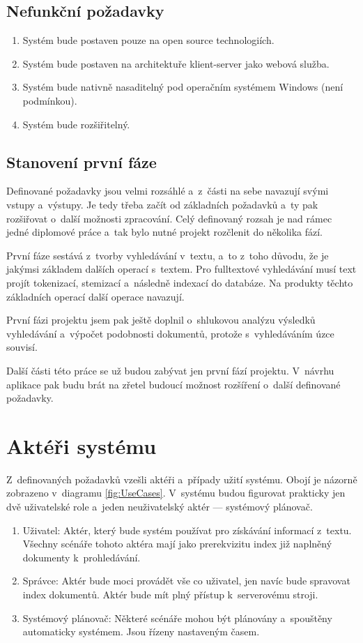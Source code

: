\subsection{Nefunkční požadavky}
\label{req_1}
\begin{enumerate}
	\item \label{req_10} Systém bude postaven pouze na open source technologiích.
	\item \label{req_11} Systém bude postaven na architektuře klient-server jako webová služba.
	\item \label{req_12} Systém bude nativně nasaditelný pod operačním systémem Windows (není podmínkou).
	\item \label{req_13} Systém bude rozšiřitelný.
\end{enumerate}

\subsection{Stanovení první fáze}
Definované požadavky jsou velmi rozsáhlé a~z~části na sebe navazují svými vstupy a~výstupy. Je tedy třeba začít od základních požadavků a~ty pak rozšiřovat o~další možnosti zpracování. Celý definovaný rozsah je nad rámec jedné diplomové práce a~tak bylo nutné projekt rozčlenit do několika fází.

První fáze sestává z~tvorby vyhledávání v~textu, a~to z~toho důvodu, že je jakýmsi základem dalších operací s~textem. Pro fulltextové vyhledávání musí text projít tokenizací, stemizací a~následně indexací do databáze. Na produkty těchto základních operací další operace navazují.

První fázi projektu jsem pak ještě doplnil o~shlukovou analýzu výsledků vyhledávání a~výpočet podobnosti dokumentů, protože s~vyhledáváním úzce souvisí.

Další části této práce se už budou zabývat jen první fází projektu. V~návrhu aplikace pak budu brát na zřetel budoucí možnost rozšíření o~další definované požadavky.

\section{Aktéři systému}
Z~definovaných požadavků vzešli aktéři a~případy užití systému. Obojí je názorně zobrazeno v~diagramu \ref{fig:UseCases}. V~systému budou figurovat prakticky jen dvě uživatelské role a~jeden neuživatelský aktér --- systémový plánovač.

\begin{enumerate}
	\item \label{itm:actor_user}Uživatel: Aktér, který bude systém používat pro získávání informací z~textu. Všechny scénáře tohoto aktéra mají jako prerekvizitu index již naplněný dokumenty k~prohledávání.
	\item \label{itm:actor_admin}Správce: Aktér bude moci provádět vše co uživatel, jen navíc bude spravovat index dokumentů. Aktér bude mít plný přístup k~serverovému stroji.
	\item \label{itm:actor_scheduler}Systémový plánovač: Některé scénáře mohou být plánovány a~spouštěny automaticky systémem. Jsou řízeny nastaveným časem.
\end{enumerate}

